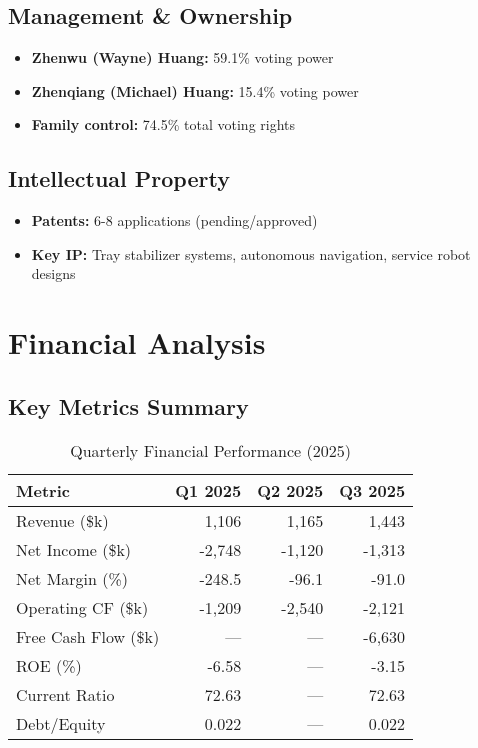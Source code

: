 \documentclass[11pt,a4paper]{article}
\begin{document}
\subsection{Management \& Ownership}
\begin{itemize}[itemsep=0pt]
    \item \textbf{Zhenwu (Wayne) Huang:} 59.1\% voting power
    \item \textbf{Zhenqiang (Michael) Huang:} 15.4\% voting power
    \item \textbf{Family control:} 74.5\% total voting rights
\end{itemize}

\subsection{Intellectual Property}
\begin{itemize}[itemsep=0pt]
    \item \textbf{Patents:} 6-8 applications (pending/approved)
    \item \textbf{Key IP:} Tray stabilizer systems, autonomous navigation, service robot designs
\end{itemize}

\section{Financial Analysis}

\subsection{Key Metrics Summary}

\begin{table}[h]
\centering
\begin{tabular}{lrrr}
\toprule
\textbf{Metric} & \textbf{Q1 2025} & \textbf{Q2 2025} & \textbf{Q3 2025} \\
\midrule
Revenue (\$k) & 1,106 & 1,165 & 1,443 \\
Net Income (\$k) & -2,748 & -1,120 & -1,313 \\
Net Margin (\%) & -248.5 & -96.1 & -91.0 \\
\midrule
Operating CF (\$k) & -1,209 & -2,540 & -2,121 \\
Free Cash Flow (\$k) & --- & --- & -6,630 \\
\midrule
ROE (\%) & -6.58 & --- & -3.15 \\
Current Ratio & 72.63 & --- & 72.63 \\
Debt/Equity & 0.022 & --- & 0.022 \\
\bottomrule
\end{tabular}
\caption{Quarterly Financial Performance (2025)}
\end{table}
\end{document}
